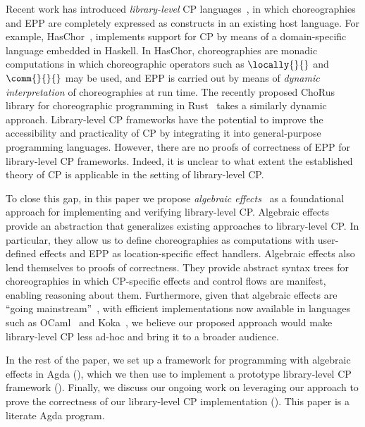 Recent work has introduced \emph{library-level} CP languages~\citep{shen-2023, kashiwa-2023}, in which choreographies and EPP are completely expressed as constructs in an existing host language.  For example, HasChor~\citep{shen-2023}, implements support for CP by means of a domain-specific language embedded in Haskell.
In HasChor, choreographies are monadic computations in which choreographic operators such as $\locally{}{}$ and $\comm{}{}{}$ may be used, and EPP is carried out by means of \emph{dynamic interpretation} of choreographies at run time.  The recently proposed ChoRus library for choreographic programming in Rust~\citep{kashiwa-2023} takes a similarly dynamic approach.
%
Library-level CP frameworks have the potential to improve the accessibility and practicality of CP by integrating it into general-purpose programming languages.
%
However, there are no proofs of correctness of EPP for library-level CP frameworks. Indeed, it is unclear to what extent the established theory of CP is applicable in the setting of library-level CP.

To close this gap, in this paper we propose \emph{algebraic effects}~\citep{plotkin-2003, plotkin-2013} as a foundational approach for implementing and verifying library-level CP.
%
Algebraic effects provide an abstraction that generalizes existing approaches to library-level CP.
%
In particular, they allow us to define choreographies as computations with user-defined effects and EPP as location-specific effect handlers.
%
Algebraic effects also lend themselves to proofs of correctness.
%
They provide abstract syntax trees for choreographies in which CP-specific effects and control flows are manifest, enabling reasoning about them.
%
Furthermore, given that algebraic effects are ``going mainstream''~\citep{dagstuhl-alg-effects-report}, with efficient implementations now available in languages such as OCaml~\citep{sivaramakrishnan-ocaml-effect-handlers} and Koka~\citep{leijen-2017}, we believe our proposed approach would make library-level CP less ad-hoc and bring it to a broader audience.


%
In the rest of the paper, we set up a framework for programming with algebraic effects in Agda (), which we then use to implement a prototype library-level CP framework ().  Finally, we discuss our ongoing work on leveraging our approach to prove the correctness of our library-level CP implementation ().  This paper is a literate Agda program.




